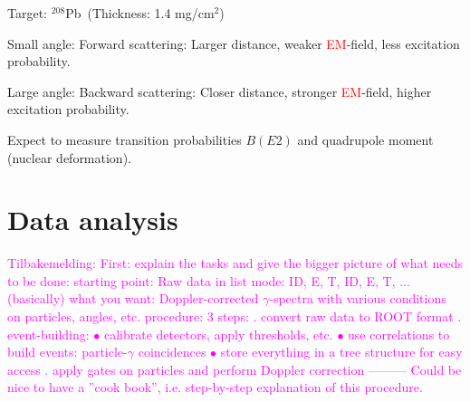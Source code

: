 \documentclass[twoside,english]{uiofysmaster/uiofysmaster}
\newcommand{\Pb}{$^{208}$Pb}
\begin{document}
Target: \Pb ~(Thickness: 1.4 mg/cm$^2$)


Small angle: Forward scattering: Larger distance, weaker \textcolor{red}{EM}-field, less excitation probability.

Large angle: Backward scattering: Closer distance, stronger \textcolor{red}{EM}-field, higher excitation probability. \newline


\bigskip

Expect to measure transition probabilities $B(E2)$ and quadrupole moment (nuclear deformation). 

\bigskip






\chapter{Data analysis} 

\textcolor{Magenta}{Tilbakemelding: \newline
First: explain the tasks and give the bigger picture of what needs to be done: \newline 
starting point: Raw data in list mode: ID, E, T, ID, E, T, ... (basically) \newline
what you want: Doppler-corrected $\gamma$-spectra with various conditions on particles, angles, etc. \newline
procedure: 3 steps: . convert raw data to ROOT format . event-building: \newline
$\bullet$ calibrate detectors, apply thresholds, etc. \newline
$\bullet$ use correlations to build events: particle-$\gamma$ coincidences \newline
$\bullet$ store everything in a tree structure for easy access . apply gates on particles and perform Doppler correction \newline
--------- \newline
Could be nice to have a ''cook book'', i.e. step-by-step explanation of this procedure.
}
\end{document}
